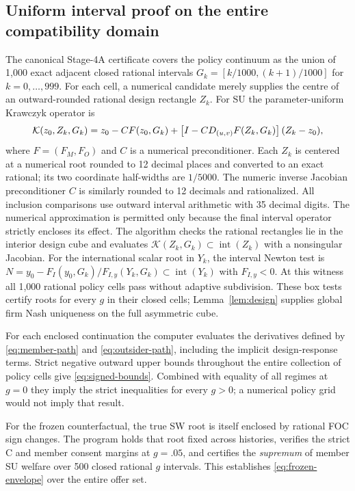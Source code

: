 \subsection{Uniform interval proof on the entire compatibility domain}

The canonical Stage-4A certificate covers the policy continuum
as the union of 1,000 exact adjacent closed rational intervals
$G_k=[k/1000,(k+1)/1000]$ for $k=0,\ldots,999$.
For each cell, a numerical candidate merely supplies the centre
of an outward-rounded rational design rectangle $Z_k$.
For SU the parameter-uniform Krawczyk operator is
\begin{equation}\label{eq:app_krawczyk}
 {\cal K}(z_0,Z_k,G_k)
 =z_0-CF(z_0,G_k)
 +\left[I-C D_{(u,v)}F(Z_k,G_k)\right](Z_k-z_0),
\end{equation}
where $F=(F_M,F_O)$ and $C$ is a numerical preconditioner.
Each $Z_k$ is centered at a numerical root rounded to
12 decimal places and converted to an exact rational;
its two coordinate half-widths are $1/5000$.
The numeric inverse Jacobian preconditioner $C$ is
similarly rounded to 12 decimals and rationalized.
All inclusion comparisons use outward interval arithmetic
with 35 decimal digits. The numerical approximation
is permitted only because the final interval operator
strictly encloses its effect. The algorithm checks
the rational rectangles lie in the interior design cube
and evaluates $\mathcal K(Z_k,G_k)\subset
\operatorname{int}(Z_k)$ with a nonsingular Jacobian.
For the international scalar root in $Y_k$,
the interval Newton test is
$N=y_0-F_I(y_0,G_k)/F_{I,y}(Y_k,G_k)
\subset\operatorname{int}(Y_k)$ with $F_{I,y}<0$.
At this witness all 1,000 rational policy cells pass
without adaptive subdivision. These box tests
certify roots for every $g$ in their closed cells;
Lemma~\ref{lem:design} supplies global firm Nash
uniqueness on the full asymmetric cube.

For each enclosed continuation the computer evaluates
the derivatives defined by \eqref{eq:member-path} and
\eqref{eq:outsider-path}, including the implicit design-response
terms. Strict negative outward upper bounds throughout the
entire collection of policy cells give
\eqref{eq:signed-bounds}. Combined with equality of all
regimes at $g=0$ they imply the strict inequalities for
every $g>0$; a numerical policy grid would not imply that result.

For the frozen counterfactual, the true SW root is itself
enclosed by rational FOC sign changes. The program holds
that root fixed across histories, verifies the strict
C and member consent margins at $g=.05$, and certifies
the \emph{supremum} of member SU welfare over 500 closed
rational $g$ intervals. This establishes
\eqref{eq:frozen-envelope} over the entire offer set.

